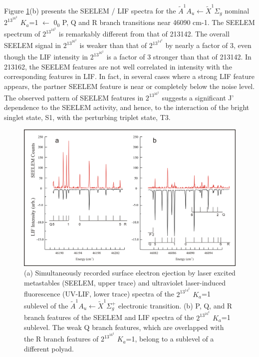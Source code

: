 \documentclass[12pt]{mitthesis}
\begin{document}
Figure \ref{fig:spectrum-2131b2}(b) presents the SEELEM / LIF spectra
for the $\tilde{A}^1A_u \leftarrow \tilde{X}^1\Sigma_g$ nominal
$2^13^16^2$ $K_a$=1 $\leftarrow$ $0_0$ P, Q and R branch transitions
near 46090 cm-1. The SEELEM spectrum of $2^13^16^2$ is remarkably different
from that of 213142. The overall SEELEM signal in $2^13^16^2$ is weaker
than that of $2^13^14^2$ by nearly a factor of 3, even though the LIF
intensity in $2^13^16^2$ is a factor of 3 stronger than that of 213142.  In
213162, the SEELEM features are not well correlated in intensity with
the corresponding features in LIF. In fact, in several cases where a
strong LIF feature appears, the partner SEELEM feature is near or
completely below the noise level. The observed pattern of SEELEM
features in $2^13^16^2$ suggests a significant J' dependence to the SEELEM
activity, and hence, to the interaction of the bright singlet state,
S1, with the perturbing triplet state, T3.

\begin{figure}
  \caption{
    (a) Simultaneously recorded surface electron ejection by laser 
    excited metastables (SEELEM, upper trace) and ultraviolet 
    laser-induced fluorescence (UV-LIF, lower trace) spectra of the 
    $2^13^14^2$ $K_a$=1 sublevel of the $\tilde{A}^1A_u \leftarrow
    \tilde{X} ^1\Sigma_g^+$ electronic transition.  (b) P, Q, and R
    branch features of the SEELEM and LIF spectra of the $2^13^16^2$ 
    $K_a$=1 sublevel. The weak Q branch features, which are overlapped 
    with the R branch features of $2^13^16^2$ $K_a$=1, belong to a 
    sublevel of a different polyad.
  }
  \label{fig:spectrum-2131b2}
  \centering
  \includegraphics[width=7.5in,angle=90]{spectrum-2131b2.png}
\end{figure}
\end{document}
